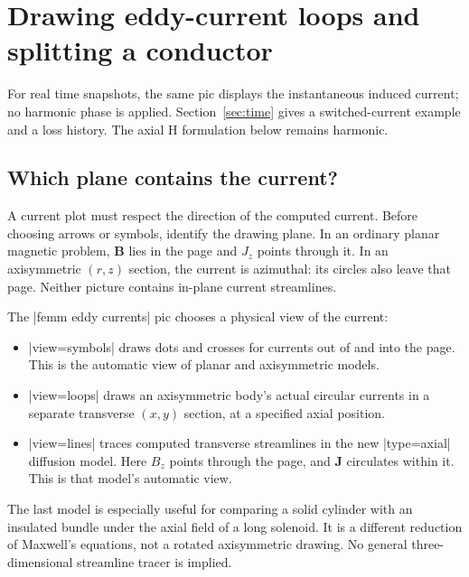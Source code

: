 \section{Drawing eddy-current loops and splitting a conductor}
\label{sec:currents}

For real time snapshots, the same pic displays the instantaneous induced current;
no harmonic phase is applied. Section~\ref{sec:time} gives a switched-current
example and a loss history. The axial H formulation below remains harmonic.

\subsection{Which plane contains the current?}
A current plot must respect the direction of the computed current.
Before choosing arrows or symbols, identify the drawing plane. In an ordinary planar magnetic problem,
$\mathbf B$ lies in the page and $J_z$ points through it. In an axisymmetric
$(r,z)$ section, the current is azimuthal: its circles also leave that page.
Neither picture contains in-plane current streamlines.

The |femm eddy currents| pic chooses a physical view of the current:
\begin{itemize}
\item |view=symbols| draws dots and crosses for currents out of and into the
page. This is the automatic view of planar and axisymmetric models.
\item |view=loops| draws an axisymmetric body's actual circular currents in a
separate transverse $(x,y)$ section, at a specified axial position.
\item |view=lines| traces computed transverse streamlines in the new
|type=axial| diffusion model. Here $B_z$ points through the page, and
$\mathbf J$ circulates within it. This is that model's automatic view.
\end{itemize}
The last model is especially useful for comparing a solid cylinder with an
insulated bundle under the axial field of a long solenoid. It is a different
reduction of Maxwell's equations, not a rotated axisymmetric drawing.
No general three-dimensional streamline tracer is implied.


